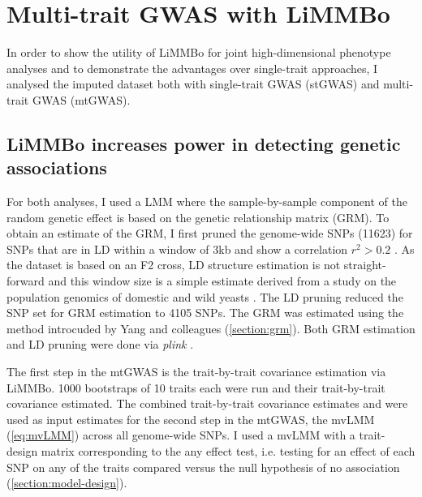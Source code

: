 \newpage
\section{Multi-trait GWAS with LiMMBo}
In order to show the utility of LiMMBo for joint high-dimensional phenotype analyses and to demonstrate the advantages over single-trait approaches, I analysed the imputed dataset both with single-trait GWAS (stGWAS) and multi-trait GWAS (mtGWAS). 

\subsection{LiMMBo increases power in detecting genetic associations}
\label{subsection:power-yeast}
For both analyses, I used a LMM where the sample-by-sample component of the random genetic effect is based on the genetic relationship matrix  (GRM). To obtain an estimate of the GRM, I first pruned the genome-wide SNPs (\num{11623}) for SNPs that are in LD within a window of 3kb and show a correlation \(r^2 > 0.2\) . As the dataset is based on an F2 cross, LD structure estimation is not straight-forward and this window size is a simple estimate derived from a study on the population genomics of domestic and wild yeasts \citep{Liti2009}. The LD pruning reduced the SNP set for GRM estimation to \num{4105} SNPs. The GRM was estimated using the method introcuded by Yang and colleagues \citep{Yang2011} (\cref{section:grm}). Both GRM estimation and LD pruning were done via \textit{plink} \cite{Chang2015}.

The first step in the mtGWAS is the trait-by-trait covariance estimation via LiMMBo. \num{1000} bootstraps of \num{10} traits each were run and their trait-by-trait covariance estimated. The combined trait-by-trait covariance estimates  and  were used as input estimates for the second step in the mtGWAS, the mvLMM  (\cref{eq:mvLMM}) across all genome-wide SNPs. I used a mvLMM with a trait-design matrix corresponding to the any effect test, i.e. testing for an effect of each SNP on any of the traits compared versus the null hypothesis of no association (\cref{section:model-design}).

